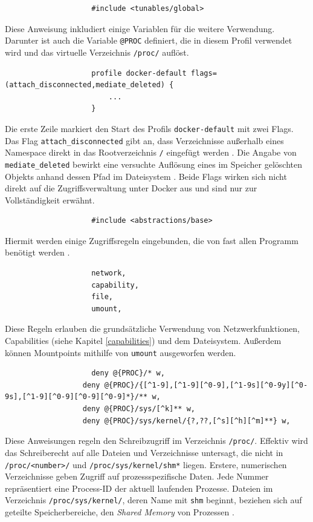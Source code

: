 \documentclass[../main.tex]{subfiles}
\begin{document}
				\begin{lstlisting}
					#include <tunables/global>
				\end{lstlisting}
				Diese Anweisung inkludiert einige Variablen für die weitere Verwendung. Darunter ist auch die Variable \texttt{@{PROC}} definiert, die in diesem Profil verwendet wird und das virtuelle Verzeichnis \texttt{/proc/} auflöst.

				\begin{lstlisting}
					profile docker-default flags=(attach_disconnected,mediate_deleted) {
						...
					}
				\end{lstlisting}
				Die erste Zeile markiert den Start des Profils \texttt{docker-default} mit zwei Flags. Das Flag \texttt{attach\_disconnected} gibt an, dass Verzeichnisse außerhalb eines Namespace direkt in das Rootverzeichnis \texttt{/} eingefügt werden \cite{apparmorPolicyReference}. Die Angabe von \texttt{mediate\_deleted} bewirkt eine versuchte Auflösung eines im Speicher gelöschten Objekts anhand dessen Pfad im Dateisystem \cite{apparmorFAQ}. Beide Flags wirken sich nicht direkt auf die Zugriffsverwaltung unter Docker aus und sind nur zur Vollständigkeit erwähnt.

				\begin{lstlisting}
					#include <abstractions/base>
				\end{lstlisting}
				Hiermit werden einige Zugriffsregeln eingebunden, die von fast allen Programm benötigt werden \cite[S.100]{SELinuxApparmor}.

				\begin{lstlisting}
					network,
					capability,
					file,
					umount,
				\end{lstlisting}
				Diese Regeln erlauben die grundsätzliche Verwendung von Netzwerkfunktionen, Capabilities (siehe Kapitel \ref{capabilities}) und dem Dateisystem. Außerdem können Mountpoints mithilfe von \texttt{umount} ausgeworfen werden.

				\begin{lstlisting}
					deny @{PROC}/* w,
				  deny @{PROC}/{[^1-9],[^1-9][^0-9],[^1-9s][^0-9y][^0-9s],[^1-9][^0-9][^0-9][^0-9]*}/** w,
				  deny @{PROC}/sys/[^k]** w,
				  deny @{PROC}/sys/kernel/{?,??,[^s][^h][^m]**} w,
				\end{lstlisting}
				Diese Anweisungen regeln den Schreibzugriff im Verzeichnis \texttt{/proc/}. Effektiv wird das Schreiberecht auf alle Dateien und Verzeichnisse untersagt, die nicht in \texttt{/proc/<number>/} und \texttt{/proc/sys/kernel/shm*} liegen. Erstere, numerischen Verzeichnisse geben Zugriff auf prozessspezifische Daten. Jede Nummer repräsentiert eine Process-ID der aktuell laufenden Prozesse. Dateien im Verzeichnis \texttt{/proc/sys/kernel/}, deren Name mit \texttt{shm} beginnt, beziehen sich auf geteilte Speicherbereiche, den \emph{Shared Memory} von Prozessen \cite{apparmorShm}.
\end{document}
